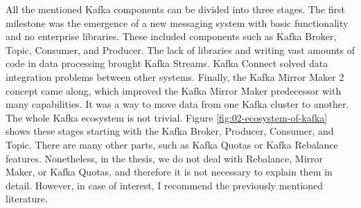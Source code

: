 All the mentioned Kafka components can be divided into three stages.
The first milestone was the emergence of a new messaging system with basic functionality and no enterprise libraries.
These included components such as Kafka Broker, Topic, Consumer, and Producer.
The lack of libraries and writing vast amounts of code in data processing brought Kafka Streams.
Kafka Connect solved data integration problems between other systems.
Finally, the Kafka Mirror Maker 2 concept came along, which improved the Kafka Mirror Maker predecessor with many capabilities.
It was a way to move data from one Kafka cluster to another.
The whole Kafka ecosystem is not trivial.
Figure \ref{fig:02-ecosystem-of-kafka} shows these stages starting with the Kafka Broker, Producer, Consumer, and Topic.
There are many other parts, such as Kafka Quotas or Kafka Rebalance features.
Nonetheless, in the thesis, we do not deal with Rebalance, Mirror Maker, or Kafka Quotas, and therefore it is not necessary to explain them in detail.
However, in case of interest, I recommend the previously mentioned literature.